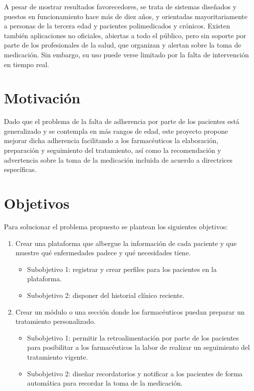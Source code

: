 A pesar de mostrar resultados favorecedores, se trata de sistemas diseñados y puestos en funcionamiento hace más de diez años, y orientadas mayoritariamente a personas de la tercera edad y pacientes polimedicados y crónicos. Existen también aplicaciones no oficiales, abiertas a todo el público, pero sin soporte por parte de los profesionales de la salud, que organizan y alertan sobre la toma de medicación. Sin embargo, su uso puede verse limitado por la falta de intervención en tiempo real. 

\section{Motivación}

Dado que el problema de la falta de adherencia por parte de los pacientes está generalizado y se contempla en más rangos de edad, este proyecto propone mejorar dicha adherencia facilitando a los farmacéuticos la elaboración, preparación y seguimiento del tratamiento, así como la recomendación y advertencia sobre la toma de la medicación incluida de acuerdo a directrices específicas. 

\section{Objetivos}
Para solucionar el problema propuesto se plantean los siguientes objetivos:

	\begin{enumerate}
		\item Crear una plataforma que albergue la información de cada paciente y que muestre qué enfermedades padece y qué necesidades tiene.
		\begin{itemize}
			\item Subobjetivo 1: registrar y crear perfiles para los pacientes en la plataforma.
			
			\item Subobjetivo 2: disponer del historial clínico reciente.
		\end{itemize}
	
		\item Crear un módulo o una sección donde los farmacéuticos puedan preparar un tratamiento personalizado.
			\begin{itemize}
				\item Subobjetivo 1: permitir la retroalimentación por parte de los pacientes para posibilitar a los farmacéuticos la labor de realizar un seguimiento del tratamiento vigente.
				
				\item Subobjetivo 2: diseñar recordatorios y notificar a los pacientes de forma automática para recordar la toma de la medicación.
				
			\end{itemize}
		
	\end{enumerate}
